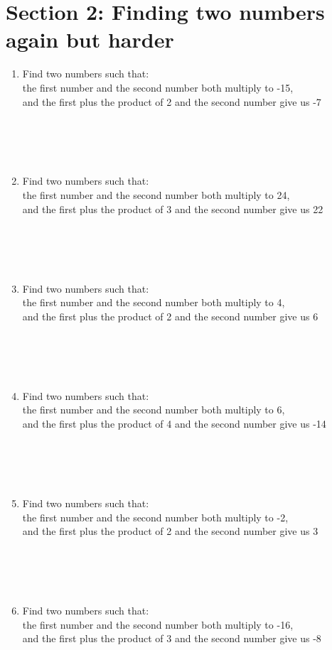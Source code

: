 \documentclass[12pt]{article}
\begin{document}
\section*{Section 2: Finding two numbers again but harder}
    \begin{enumerate}[\#1]
        \item Find two numbers such that: \\
        the first number and the second number both multiply to -15,\\
        and the first plus the product of 2 and the second number give us -7
        \\\\\\\\\\
        \item Find two numbers such that: \\
        the first number and the second number both multiply to 24,\\
        and the first plus the product of 3 and the second number give us 22
        \\\\\\\\\\
        \item Find two numbers such that: \\
        the first number and the second number both multiply to 4,\\
        and the first plus the product of 2 and the second number give us 6
        \\\\\\\\\\
        \item Find two numbers such that: \\
        the first number and the second number both multiply to 6,\\
        and the first plus the product of 4 and the second number give us -14
        \\\\\\\\\\
        \item Find two numbers such that: \\
        the first number and the second number both multiply to -2,\\
        and the first plus the product of 2 and the second number give us 3
        \\\\\\\\\\
        \item Find two numbers such that: \\
        the first number and the second number both multiply to -16,\\
        and the first plus the product of 3 and the second number give us -8
    \end{enumerate}
\end{document}
